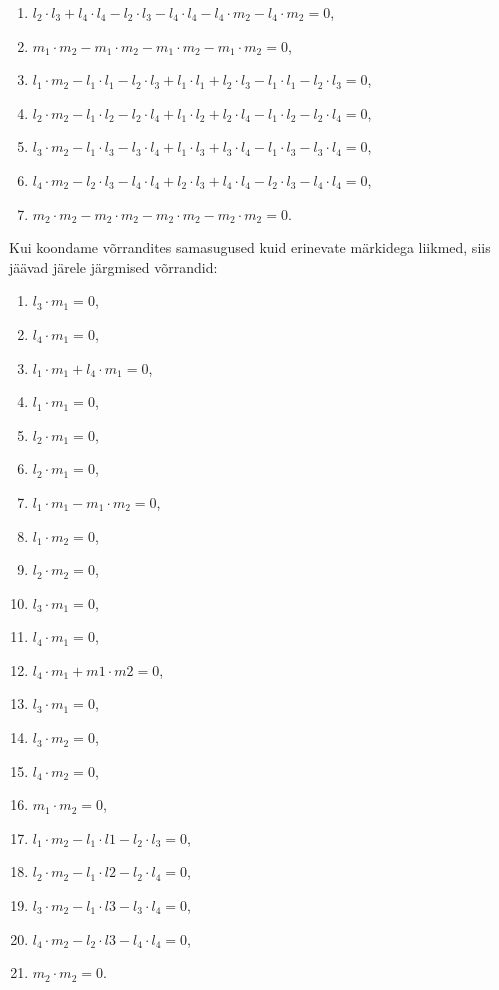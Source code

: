\begin{enumerate}
    \item $l_2 \cdot l_3 + l_4 \cdot l_4 - l_2 \cdot l_3 - l_4 \cdot l_4 - l_4 \cdot m_2 - l_4 \cdot m_2 = 0$,
    \item $m_1 \cdot m_2 - m_1 \cdot m_2 - m_1 \cdot m_2 - m_1 \cdot m_2 = 0$,
    \item $l_1 \cdot m_2 - l_1 \cdot l_1 - l_2 \cdot l_3 + l_1 \cdot l_1 + l_2 \cdot l_3 - l_1 \cdot l_1 - l_2 \cdot l_3 = 0$,
    \item $l_2 \cdot m_2 - l_1 \cdot l_2 - l_2 \cdot l_4 + l_1 \cdot l_2 + l_2 \cdot l_4 - l_1 \cdot l_2 - l_2 \cdot l_4 = 0$,
    \item $l_3 \cdot m_2 - l_1 \cdot l_3 - l_3 \cdot l_4 + l_1 \cdot l_3 + l_3 \cdot l_4 - l_1 \cdot l_3 - l_3 \cdot l_4 = 0$,
    \item $l_4 \cdot m_2 - l_2 \cdot l_3 - l_4 \cdot l_4 + l_2 \cdot l_3 + l_4 \cdot l_4 - l_2 \cdot l_3 - l_4 \cdot l_4 = 0$,
    \item $m_2 \cdot m_2 - m_2 \cdot m_2 - m_2 \cdot m_2 - m_2 \cdot m_2 = 0$.
\end{enumerate}

Kui koondame võrrandites samasugused kuid erinevate märkidega liikmed, siis
jäävad järele järgmised võrrandid:
\begin{multicols}{2}
\begin{enumerate}
    \item $l_3 \cdot m_1 = 0$,
    \item $l_4 \cdot m_1 = 0$,
    \item $l_1 \cdot m_1 + l_4 \cdot m_1 = 0$,
    \item $l_1 \cdot m_1 = 0$,
    \item $l_2 \cdot m_1 = 0$,
    \item $l_2 \cdot m_1 = 0$,
    \item $l_1 \cdot m_1 - m_1 \cdot m_2 = 0$,
    \item $l_1 \cdot m_2 = 0$,
    \item $l_2 \cdot m_2 = 0$,
    \item $l_3 \cdot m_1 = 0$,
    \item $l_4 \cdot m_1 = 0$,
    \item $l_4 \cdot m_1 + m1 \cdot m2 = 0$,
    \item $l_3 \cdot m_1 = 0$,
    \item $l_3 \cdot m_2 = 0$,
    \item $l_4 \cdot m_2 = 0$,
    \item $m_1 \cdot m_2 = 0$,
    \item $l_1 \cdot m_2 - l_1 \cdot l1 - l_2 \cdot l_3 = 0$,
    \item $l_2 \cdot m_2 - l_1 \cdot l2 - l_2 \cdot l_4 = 0$,
    \item $l_3 \cdot m_2 - l_1 \cdot l3 - l_3 \cdot l_4 = 0$,
    \item $l_4 \cdot m_2 - l_2 \cdot l3 - l_4 \cdot l_4 = 0$,
    \item $m_2 \cdot m_2 = 0$.
\end{enumerate}
\end{multicols}

